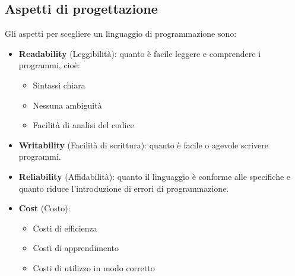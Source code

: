 \documentclass[a4paper]{article}
\begin{document}
\subsection{Aspetti di progettazione}
Gli aspetti per scegliere un linguaggio di programmazione sono:
\begin{itemize}
  \item \textbf{Readability} (Leggibilità): quanto è facile leggere e comprendere i
    programmi, cioè:
    \begin{itemize}
      \item Sintassi chiara
      \item Nessuna ambiguità
      \item Facilità di analisi del codice
    \end{itemize}

  \item \textbf{Writability} (Facilità di scrittura): quanto è facile o agevole scrivere
    programmi.

  \item \textbf{Reliability} (Affidabilità): quanto il linguaggio è conforme alle specifiche
    e quanto riduce l'introduzione di errori di programmazione.

  \item \textbf{Cost} (Costo):
    \begin{itemize}
      \item Costi di efficienza
      \item Costi di apprendimento
      \item Costi di utilizzo in modo corretto
    \end{itemize}
\end{itemize}
\end{document}
